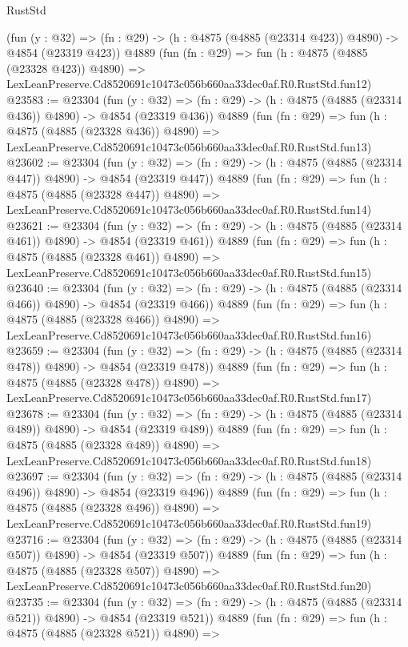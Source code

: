 \begin{lexlean}{RustStd}
\begin{coremodule}
    (fun (y : @32) => (fn : @29) -> (h : @4875 (@4885 (@23314 @423)) @4890) -> @4854 (@23319 @423))
    @4889
    (fun (fn : @29) =>
    fun (h : @4875 (@4885 (@23328 @423)) @4890) =>
    LexLeanPreserve.Cd8520691c10473c056b660aa33dec0af.R0.RustStd.fun12)
@23583 := @23304
    (fun (y : @32) => (fn : @29) -> (h : @4875 (@4885 (@23314 @436)) @4890) -> @4854 (@23319 @436))
    @4889
    (fun (fn : @29) =>
    fun (h : @4875 (@4885 (@23328 @436)) @4890) =>
    LexLeanPreserve.Cd8520691c10473c056b660aa33dec0af.R0.RustStd.fun13)
@23602 := @23304
    (fun (y : @32) => (fn : @29) -> (h : @4875 (@4885 (@23314 @447)) @4890) -> @4854 (@23319 @447))
    @4889
    (fun (fn : @29) =>
    fun (h : @4875 (@4885 (@23328 @447)) @4890) =>
    LexLeanPreserve.Cd8520691c10473c056b660aa33dec0af.R0.RustStd.fun14)
@23621 := @23304
    (fun (y : @32) => (fn : @29) -> (h : @4875 (@4885 (@23314 @461)) @4890) -> @4854 (@23319 @461))
    @4889
    (fun (fn : @29) =>
    fun (h : @4875 (@4885 (@23328 @461)) @4890) =>
    LexLeanPreserve.Cd8520691c10473c056b660aa33dec0af.R0.RustStd.fun15)
@23640 := @23304
    (fun (y : @32) => (fn : @29) -> (h : @4875 (@4885 (@23314 @466)) @4890) -> @4854 (@23319 @466))
    @4889
    (fun (fn : @29) =>
    fun (h : @4875 (@4885 (@23328 @466)) @4890) =>
    LexLeanPreserve.Cd8520691c10473c056b660aa33dec0af.R0.RustStd.fun16)
@23659 := @23304
    (fun (y : @32) => (fn : @29) -> (h : @4875 (@4885 (@23314 @478)) @4890) -> @4854 (@23319 @478))
    @4889
    (fun (fn : @29) =>
    fun (h : @4875 (@4885 (@23328 @478)) @4890) =>
    LexLeanPreserve.Cd8520691c10473c056b660aa33dec0af.R0.RustStd.fun17)
@23678 := @23304
    (fun (y : @32) => (fn : @29) -> (h : @4875 (@4885 (@23314 @489)) @4890) -> @4854 (@23319 @489))
    @4889
    (fun (fn : @29) =>
    fun (h : @4875 (@4885 (@23328 @489)) @4890) =>
    LexLeanPreserve.Cd8520691c10473c056b660aa33dec0af.R0.RustStd.fun18)
@23697 := @23304
    (fun (y : @32) => (fn : @29) -> (h : @4875 (@4885 (@23314 @496)) @4890) -> @4854 (@23319 @496))
    @4889
    (fun (fn : @29) =>
    fun (h : @4875 (@4885 (@23328 @496)) @4890) =>
    LexLeanPreserve.Cd8520691c10473c056b660aa33dec0af.R0.RustStd.fun19)
@23716 := @23304
    (fun (y : @32) => (fn : @29) -> (h : @4875 (@4885 (@23314 @507)) @4890) -> @4854 (@23319 @507))
    @4889
    (fun (fn : @29) =>
    fun (h : @4875 (@4885 (@23328 @507)) @4890) =>
    LexLeanPreserve.Cd8520691c10473c056b660aa33dec0af.R0.RustStd.fun20)
@23735 := @23304
    (fun (y : @32) => (fn : @29) -> (h : @4875 (@4885 (@23314 @521)) @4890) -> @4854 (@23319 @521))
    @4889
    (fun (fn : @29) =>
    fun (h : @4875 (@4885 (@23328 @521)) @4890) =>

\end{coremodule}
\end{lexlean}
